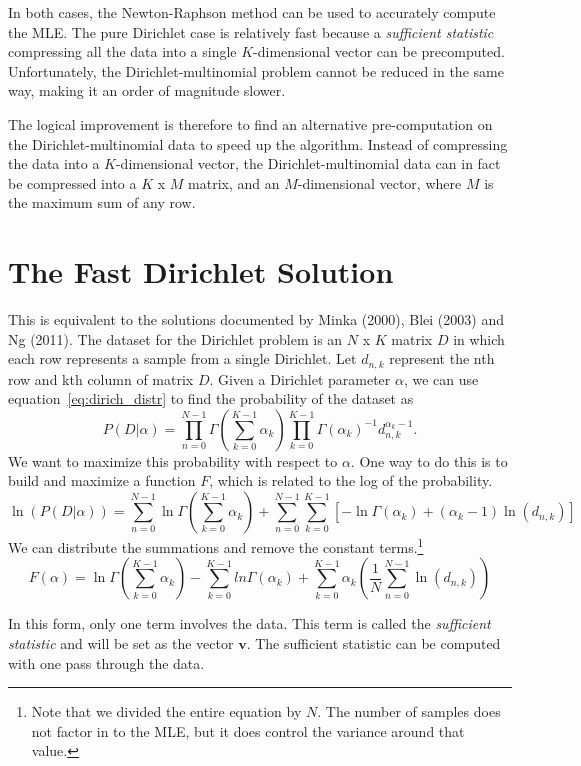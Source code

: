 \documentclass[twoside]{article}
\begin{document}
In both cases, the Newton-Raphson method can be used to accurately compute the MLE\cite{minka}.  The pure Dirichlet case is relatively fast because a \textit{sufficient statistic} compressing all the data into a single \(K\)-dimensional vector can be precomputed.  Unfortunately, the Dirichlet-multinomial problem cannot be reduced in the same way, making it an order of magnitude slower.

The logical improvement is therefore to find an alternative pre-computation on the Dirichlet-multinomial data to speed up the algorithm.  Instead of compressing the data into a \(K\)-dimensional vector, the Dirichlet-multinomial data can in fact be compressed into a \(K\) x \(M\) matrix, and an \(M\)-dimensional vector, where \(M\) is the maximum sum of any row.

\section{The Fast Dirichlet Solution}
\label{fastdirichlet}

This is equivalent to the solutions documented by Minka\cite{minka} (2000), Blei\cite[A.4.2]{blei} (2003) and Ng\cite[pg 72-73]{ng} (2011).  The dataset for the Dirichlet problem is an \(N\) x \(K\) matrix $D$ in which each row represents a sample from a single Dirichlet.  Let $d_{n,k}$ represent the nth row and kth column of matrix $D$.  Given a Dirichlet parameter $\alpha$, we can use equation~\eqref{eq:dirich_distr} to find the probability of the dataset as
\[
P(D|\alpha)=\prod_{n=0}^{N-1}\Gamma\left(\sum_{k=0}^{K-1}\alpha_k\right)\prod_{k=0}^{K-1}\Gamma(\alpha_k)^{-1}d_{n,k}^{\alpha_k-1}.
\]
We want to maximize this probability with respect to $\alpha$.  One way to do this is to build and maximize a function $F$, which is related to the log of the probability.
\[
\ln(P(D|\alpha))=\sum_{n=0}^{N-1}\ln\Gamma\left(\sum_{k=0}^{K-1}\alpha_k\right) + \sum_{n=0}^{N-1}\sum_{k=0}^{K-1}\left[-\ln\Gamma(\alpha_k) + (\alpha_k-1)\ln\left(d_{n,k}\right)\right]
\]
We can distribute the summations and remove the constant terms.\footnote{Note that we divided the entire equation by $N$.  The number of samples does not factor in to the MLE, but it does control the variance around that value.}
\[
F(\alpha)=\ln\Gamma\left(\sum_{k=0}^{K-1}\alpha_k\right) - \sum_{k=0}^{K-1}ln\Gamma(\alpha_k) + \sum_{k=0}^{K-1}\alpha_k\left(\frac{1}{N}\sum_{n=0}^{N-1}\ln\left(d_{n,k}\right)\right)
\]

In this form, only one term involves the data. This term is called the \textit{sufficient statistic} and will be set as the vector $\mathbf{v}$. The sufficient statistic can be computed with one pass through the data.
\end{document}
